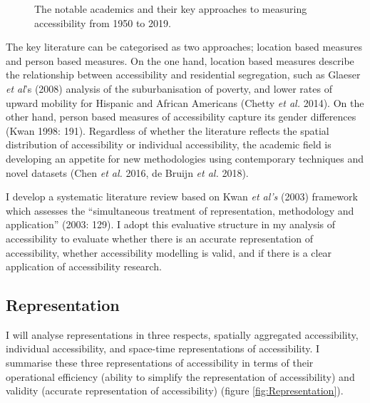 \documentclass[a4paper,UKenglish]{lipics-v2018}
\begin{document}
\begin{figure}[H]
    \centering
    \caption[Literature Timeline]{The notable academics and their key approaches to measuring accessibility from 1950 to 2019.} 
    \label{fig:Literature_timeline_new}
\end{figure}

The key literature can be categorised as two approaches; location based measures and person based measures. On the one hand, location based measures describe the relationship between accessibility and residential segregation, such as Glaeser \textit{et al}’s (2008) analysis of the suburbanisation of poverty, and lower rates of upward mobility for Hispanic and African Americans (Chetty \textit{et al.} 2014). On the other hand, person based measures of accessibility capture its gender differences (Kwan 1998: 191). Regardless of whether the literature reflects the spatial distribution of accessibility or individual accessibility, the academic field is developing an appetite for new methodologies using contemporary techniques and novel datasets (Chen \textit{et al.} 2016, de Bruijn \textit{et al.} 2018).

I develop a systematic literature review based on Kwan \textit{et al’s} (2003) framework which assesses the “simultaneous treatment of representation, methodology and application” (2003: 129). I adopt this evaluative structure in my analysis of accessibility to evaluate whether there is an accurate representation of accessibility, whether accessibility modelling is valid, and if there is a clear application of accessibility research. 

\subsection{Representation}
I will analyse representations in three respects, spatially aggregated accessibility, individual accessibility, and space-time representations of accessibility. I summarise these three representations of accessibility in terms of their operational efficiency (ability to simplify the representation of accessibility) and validity (accurate representation of accessibility) (figure \ref{fig:Representation}).
\end{document}
